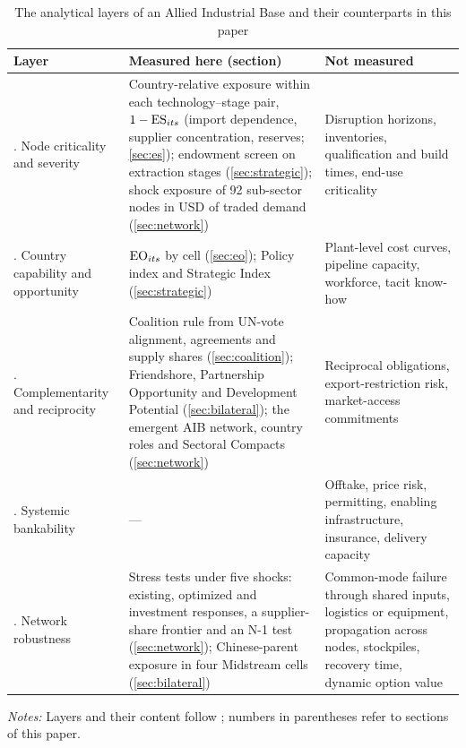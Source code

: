 \begin{table}[tbp]
\centering
\begin{threeparttable}
\caption{The analytical layers of an Allied Industrial Base and their counterparts in this paper}
\label{tab:framework_layers}
\footnotesize
\begin{tabularx}{\textwidth}{@{}>{\raggedright\arraybackslash}p{2.7cm}
  >{\raggedright\arraybackslash}X >{\raggedright\arraybackslash}X@{}}
\toprule
Layer & Measured here (section) & Not measured\\
\midrule
1. Node criticality and severity &
  Country-relative exposure within each technology--stage pair, $1-\mathrm{ES}_{its}$ (import
  dependence, supplier concentration, reserves; \ref{sec:es}); endowment screen on extraction
  stages (\ref{sec:strategic}); shock exposure of 92 sub-sector nodes in USD of traded demand
  (\ref{sec:network}) &
  Disruption horizons, inventories, qualification and build times, end-use criticality\\[2pt]
2. Country capability and opportunity &
  $\mathrm{EO}_{its}$ by cell (\ref{sec:eo}); Policy index and Strategic Index (\ref{sec:strategic}) &
  Plant-level cost curves, pipeline capacity, workforce, tacit know-how\\[2pt]
3. Complementarity and reciprocity &
  Coalition rule from UN-vote alignment, agreements and supply shares (\ref{sec:coalition});
  Friendshore, Partnership Opportunity and Development Potential (\ref{sec:bilateral}); the emergent
  AIB network, country roles and Sectoral Compacts (\ref{sec:network}) &
  Reciprocal obligations, export-restriction risk, market-access commitments\\[2pt]
4. Systemic bankability & --- &
  Offtake, price risk, permitting, enabling infrastructure, insurance, delivery capacity\\[2pt]
5. Network robustness &
  Stress tests under five shocks: existing, optimized and investment responses, a supplier-share
  frontier and an N-1 test (\ref{sec:network}); Chinese-parent exposure in four Midstream cells
  (\ref{sec:bilateral}) &
  Common-mode failure through shared inputs, logistics or equipment, propagation across nodes,
  stockpiles, recovery time, dynamic option value\\
\bottomrule
\end{tabularx}
\begin{tablenotes}[flushleft]\footnotesize
\item \textit{Notes:} Layers and their content follow \citet{neis2026allied}; numbers in
parentheses refer to sections of this paper.
\end{tablenotes}
\end{threeparttable}
\end{table}

